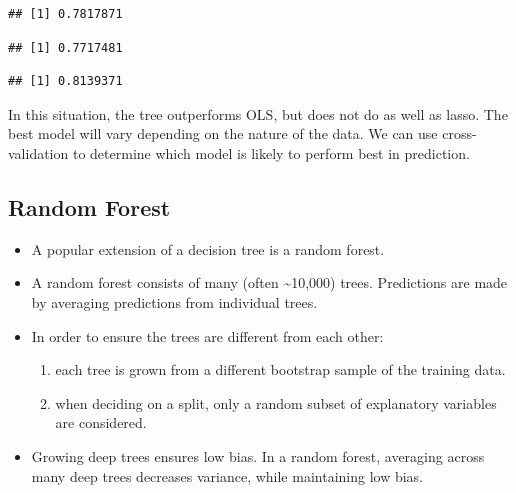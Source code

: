 \documentclass[]{book}
\newenvironment{Shaded}{\begin{snugshade}}{\end{snugshade}}
\newcommand{\KeywordTok}[1]{\textcolor[rgb]{0.13,0.29,0.53}{\textbf{#1}}}
\newcommand{\OperatorTok}[1]{\textcolor[rgb]{0.81,0.36,0.00}{\textbf{#1}}}
\newcommand{\NormalTok}[1]{#1}
\providecommand{\tightlist}{%
  \setlength{\itemsep}{0pt}\setlength{\parskip}{0pt}}
\begin{document}
\begin{verbatim}
## [1] 0.7817871
\end{verbatim}

\begin{Shaded}
\end{Shaded}

\begin{verbatim}
## [1] 0.7717481
\end{verbatim}

\begin{Shaded}
\end{Shaded}

\begin{verbatim}
## [1] 0.8139371
\end{verbatim}

In this situation, the tree outperforms OLS, but does not do as well as
lasso. The best model will vary depending on the nature of the data. We
can use cross-validation to determine which model is likely to perform
best in prediction.

\subsection{Random Forest}\label{random-forest}

\begin{itemize}
\item
  A popular extension of a decision tree is a random forest.
\item
  A random forest consists of many (often \textasciitilde{}10,000)
  trees. Predictions are made by averaging predictions from individual
  trees.
\item
  In order to ensure the trees are different from each other:

  \begin{enumerate}
  \def\labelenumi{\arabic{enumi}.}
  \tightlist
  \item
    each tree is grown from a different bootstrap sample of the training
    data.\\
  \item
    when deciding on a split, only a random subset of explanatory
    variables are considered.
  \end{enumerate}
\item
  Growing deep trees ensures low bias. In a random forest, averaging
  across many deep trees decreases variance, while maintaining low bias.
\end{itemize}
\end{document}
